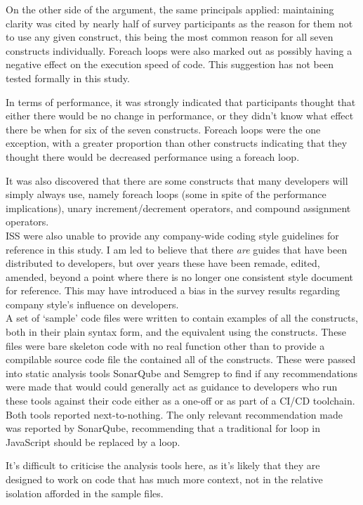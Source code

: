 \documentclass{article}
\begin{document}
            On the other side of the argument, the same principals applied: maintaining clarity was cited by nearly half of survey participants as the reason for them not to use any given construct, this being the most common reason for all seven constructs individually. Foreach loops were also marked out as possibly having a negative effect on the execution speed of code. This suggestion has not been tested formally in this study.

            In terms of performance, it was strongly indicated that participants thought that either there would be no change in performance, or they didn't know what effect there be when for six of the seven constructs. Foreach loops were the one exception, with a greater proportion than other constructs indicating that they thought there would be decreased performance using a foreach loop.

            It was also discovered that there are some constructs that many developers will simply always use, namely foreach loops (some in spite of the performance implications), unary increment/decrement operators, and compound assignment operators.
            \\
            ISS were also unable to provide any company-wide coding style guidelines for reference in this study. I am led to believe that there \emph{are} guides that have been distributed to developers, but over years these have been remade, edited, amended, beyond a point where there is no longer one consistent style document for reference. This may have introduced a bias in the survey results regarding company style's influence on developers.
            \\

            A set of `sample' code files were written to contain examples of all the constructs, both in their plain syntax form, and the equivalent using the constructs. These files were bare skeleton code with no real function other than to provide a compilable source code file the contained all of the constructs. These were passed into static analysis tools SonarQube and Semgrep to find if any recommendations were made that would could generally act as guidance to developers who run these tools against their code either as a one-off or as part of a CI/CD toolchain. Both tools reported next-to-nothing. The only relevant recommendation made was reported by SonarQube, recommending that a traditional for loop in JavaScript should be replaced by a  loop.

            It's difficult to criticise the analysis tools here, as it's likely that they are designed to work on code that has much more context, not in the relative isolation afforded in the sample files.
\end{document}
